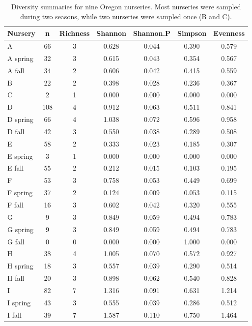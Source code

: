 \documentclass[12pt]{article}
\begin{document}
\begin{table}[ht]
\caption{Diversity summaries for nine Oregon nurseries.  Most nurseries were sampled during two seasons, while two nurseries were sampled once (B and C).}
\centering
\begin{tabular}{lcccccc}
  \hline
  \textbf{Nursery} & \textbf{n} & \textbf{Richness} & \textbf{Shannon} & \textbf{Shannon.P} & \textbf{Simpson} & \textbf{Evenness} \\ 
  \hline
  A & 66 & 3 & 0.628 & 0.044 & 0.390 & 0.579 \\ 
  A spring & 32 & 3 & 0.615 & 0.043 & 0.354 & 0.567 \\ 
  A fall & 34 & 2 & 0.606 & 0.042 & 0.415 & 0.559 \\ 
  \hline
  B & 22 & 2 & 0.398 & 0.028 & 0.236 & 0.367 \\ 
  \hline
  C & 2 & 1 & 0.000 & 0.000 & 0.000 & 0.000 \\ 
  \hline
  D & 108 & 4 & 0.912 & 0.063 & 0.511 & 0.841 \\ 
  D spring & 66 & 4 & 1.038 & 0.072 & 0.596 & 0.958 \\ 
  D fall & 42 & 3 & 0.550 & 0.038 & 0.289 & 0.508 \\ 
  \hline
  E & 58 & 2 & 0.333 & 0.023 & 0.185 & 0.307 \\ 
  E spring & 3 & 1 & 0.000 & 0.000 & 0.000 & 0.000 \\ 
  E fall & 55 & 2 & 0.212 & 0.015 & 0.103 & 0.195 \\ 
  \hline
  F & 53 & 3 & 0.758 & 0.053 & 0.449 & 0.699 \\ 
  F spring & 37 & 2 & 0.124 & 0.009 & 0.053 & 0.115 \\ 
  F fall & 16 & 3 & 0.602 & 0.042 & 0.320 & 0.555 \\ 
  \hline
  G & 9 & 3 & 0.849 & 0.059 & 0.494 & 0.783 \\ 
  G spring & 9 & 3 & 0.849 & 0.059 & 0.494 & 0.783 \\ 
  G fall & 0 & 0 & 0.000 & 0.000 & 1.000 & 0.000 \\ 
  \hline
  H & 38 & 4 & 1.005 & 0.070 & 0.572 & 0.927 \\ 
  H spring & 18 & 3 & 0.557 & 0.039 & 0.290 & 0.514 \\ 
  H fall & 20 & 3 & 0.898 & 0.062 & 0.540 & 0.828 \\ 
  \hline
  I & 82 & 7 & 1.316 & 0.091 & 0.631 & 1.214 \\ 
  I spring & 43 & 3 & 0.555 & 0.039 & 0.286 & 0.512 \\ 
  I fall & 39 & 7 & 1.587 & 0.110 & 0.750 & 1.464 \\ 
  \hline
\end{tabular}
\label{tab:div}
\end{table}
\end{document}
